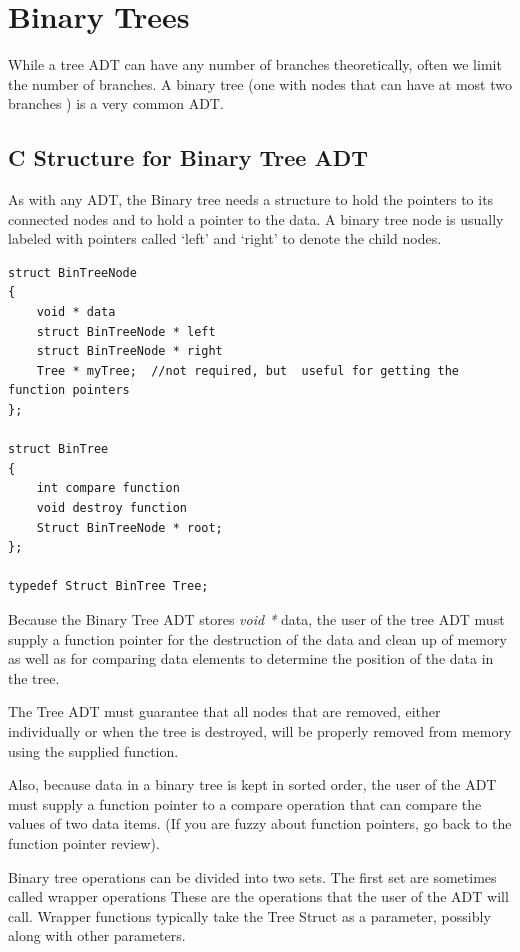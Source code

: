 \section{Binary Trees}

While a tree ADT can have any number of branches theoretically, often we
limit the number of branches. A binary tree (one with nodes that can
have at most two branches ) is a very common ADT. 

\subsection {C Structure for Binary Tree ADT}

As with any ADT, the Binary tree needs a structure to hold the pointers
to its connected nodes and to hold a pointer to the data. A binary tree
node is usually labeled with pointers called `left' and `right' to
denote the child nodes.

\begin{lstlisting}
struct BinTreeNode
{
	void * data
	struct BinTreeNode * left
	struct BinTreeNode * right
	Tree * myTree;  //not required, but  useful for getting the function pointers
};

struct BinTree
{
	int compare function
	void destroy function
	Struct BinTreeNode * root;
};

typedef Struct BinTree Tree;
\end{lstlisting}

Because the Binary Tree ADT stores \emph{void * } data,  the user of the tree ADT must supply a function pointer for
the destruction of the data and clean up of memory as well as for comparing data elements to determine the position of the data in the tree.

  The Tree ADT
must guarantee that all nodes that are removed, either individually
or when the tree is destroyed, will be properly removed from memory
using the supplied function. 

Also, because data in a binary tree is kept
in sorted order, the user of the ADT must supply a function pointer to a
compare operation that can compare the values of two data items. (If you
are fuzzy about function pointers, go back to the function pointer
review).

Binary tree operations can be divided into two sets. The first set are
sometimes called wrapper operations  These are the operations that the
user of the ADT will call.  Wrapper functions typically take the Tree Struct as a parameter, possibly along with other parameters.

